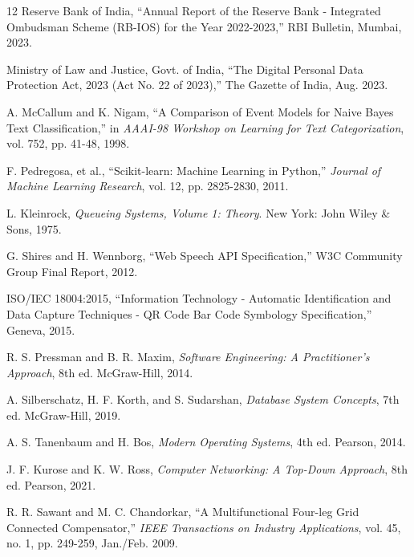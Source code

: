\documentclass[12pt,singleside,a4paper]{article}
\begin{document}
\begin{thebibliography}{12}
Reserve Bank of India, ``Annual Report of the Reserve Bank - Integrated Ombudsman Scheme (RB-IOS) for the Year 2022-2023,'' RBI Bulletin, Mumbai, 2023.

Ministry of Law and Justice, Govt. of India, ``The Digital Personal Data Protection Act, 2023 (Act No. 22 of 2023),'' The Gazette of India, Aug. 2023.

A. McCallum and K. Nigam, ``A Comparison of Event Models for Naive Bayes Text Classification,'' in \textit{AAAI-98 Workshop on Learning for Text Categorization}, vol. 752, pp. 41-48, 1998.

F. Pedregosa, et al., ``Scikit-learn: Machine Learning in Python,'' \textit{Journal of Machine Learning Research}, vol. 12, pp. 2825-2830, 2011.

L. Kleinrock, \textit{Queueing Systems, Volume 1: Theory}. New York: John Wiley \& Sons, 1975.

G. Shires and H. Wennborg, ``Web Speech API Specification,'' W3C Community Group Final Report, 2012.

ISO/IEC 18004:2015, ``Information Technology - Automatic Identification and Data Capture Techniques - QR Code Bar Code Symbology Specification,'' Geneva, 2015.

R. S. Pressman and B. R. Maxim, \textit{Software Engineering: A Practitioner's Approach}, 8th ed. McGraw-Hill, 2014.

A. Silberschatz, H. F. Korth, and S. Sudarshan, \textit{Database System Concepts}, 7th ed. McGraw-Hill, 2019.

A. S. Tanenbaum and H. Bos, \textit{Modern Operating Systems}, 4th ed. Pearson, 2014.

J. F. Kurose and K. W. Ross, \textit{Computer Networking: A Top-Down Approach}, 8th ed. Pearson, 2021.

R. R. Sawant and M. C. Chandorkar, ``A Multifunctional Four-leg Grid Connected Compensator,'' \textit{IEEE Transactions on Industry Applications}, vol. 45, no. 1, pp. 249-259, Jan./Feb. 2009.
\end{thebibliography}
\end{document}
